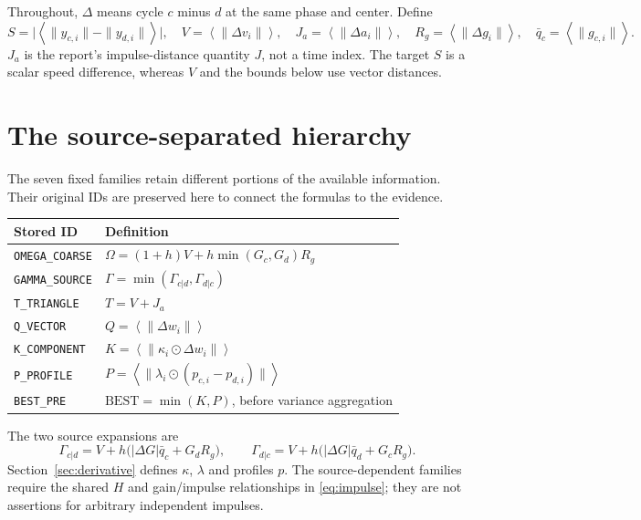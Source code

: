 \documentclass[11pt,a4paper]{article}
\newcommand{\avg}[1]{\left\langle #1\right\rangle}
\begin{document}
Throughout, $\Delta$ means cycle $c$ minus $d$ at the same phase and center. Define
\begin{equation}\label{eq:inputs}
S=\big|\avg{\|y_{c,i}\|-\|y_{d,i}\|}\big|,\quad
V=\avg{\|\Delta v_i\|},\quad J_a=\avg{\|\Delta a_i\|},\quad
R_g=\avg{\|\Delta g_i\|},\quad \bar q_c=\avg{\|g_{c,i}\|}.
\end{equation}
$J_a$ is the report's impulse-distance quantity $J$, not a time index. The target $S$ is a scalar speed difference, whereas $V$ and the bounds below use vector distances.

\clearpage
\section{The source-separated hierarchy}\label{sec:hierarchy}
The seven fixed families retain different portions of the available information. Their original IDs are preserved here to connect the formulas to the evidence.
\begin{center}\small
\begin{tabular}{ll}\toprule
Stored ID & Definition\\\midrule
\texttt{OMEGA\_COARSE} & $\Omega=(1+h)V+h\min(G_c,G_d)R_g$\\
\texttt{GAMMA\_SOURCE} & $\Gamma=\min(\Gamma_{c|d},\Gamma_{d|c})$\\
\texttt{T\_TRIANGLE} & $T=V+J_a$\\
\texttt{Q\_VECTOR} & $Q=\avg{\|\Delta w_i\|}$\\
\texttt{K\_COMPONENT} & $K=\avg{\|\kappa_i\odot\Delta w_i\|}$\\
\texttt{P\_PROFILE} & $P=\avg{\|\lambda_i\odot(p_{c,i}-p_{d,i})\|}$\\
\texttt{BEST\_PRE} & $\mathrm{BEST}=\min(K,P)$, before variance aggregation\\\bottomrule
\end{tabular}
\end{center}
The two source expansions are
\begin{equation}\label{eq:gamma}
\Gamma_{c|d}=V+h\bigl(|\Delta G|\bar q_c+G_dR_g\bigr),\qquad
\Gamma_{d|c}=V+h\bigl(|\Delta G|\bar q_d+G_cR_g\bigr).
\end{equation}
Section~\ref{sec:derivative} defines $\kappa$, $\lambda$ and profiles $p$. The source-dependent families require the shared $H$ and gain/impulse relationships in \eqref{eq:impulse}; they are not assertions for arbitrary independent impulses.
\end{document}
